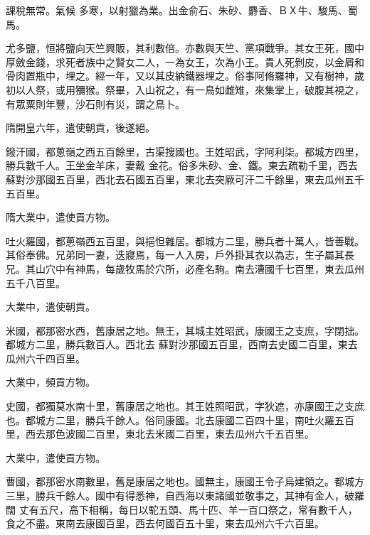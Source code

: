 \begin{pinyinscope}
 課稅無常。氣候
 多寒，以射獵為業。出金俞石、朱砂、麝香、ＢＸ牛、駿馬、蜀馬。



 尤多鹽，恒將鹽向天竺興販，其利數倍。亦數與天竺、黨項戰爭。其女王死，國中厚斂金錢，求死者族中之賢女二人，一為女王，次為小王。貴人死剝皮，以金屑和骨肉置瓶中，埋之。經一年，又以其皮納鐵器埋之。俗事阿脩羅神，又有樹神，歲初以人祭，或用獼猴。祭畢，入山祝之，有一鳥如雌雉，來集掌上，破腹其視之，有眾粟則年豐，沙石則有災，謂之鳥卜。



 隋開皇六年，遣使朝貢，後遂絕。



 鏺汗國，都蔥嶺之西五百餘里，古渠搜國也。王姓昭武，字阿利柒。都城方四里，勝兵數千人。王坐金羊床，妻戴
 金花。俗多朱砂、金、鐵。東去疏勒千里，西去蘇對沙那國五百里，西北去石國五百里，東北去突厥可汗二千餘里，東去瓜州五千五百里。



 隋大業中，遣使貢方物。



 吐火羅國，都蔥嶺西五百里，與挹怛雜居。都城方二里，勝兵者十萬人，皆善戰。其俗奉佛。兄弟同一妻，迭寢焉，每一人入房，戶外掛其衣以為志，生子屬其長兄。其山穴中有神馬，每歲牧馬於穴所，必產名駒。南去漕國千七百里，東去瓜州五千八百里。



 大業中，遣使朝貢。



 米國，都那密水西，舊康居之地。無王，其城主姓昭武，康國王之支庶，字閉拙。都城方二里，勝兵數百人。西北去
 蘇對沙那國五百里，西南去史國二百里，東去瓜州六千四百里。



 大業中，頻貢方物。



 史國，都獨莫水南十里，舊康居之地也。其王姓照昭武，字狄遮，亦康國王之支庶也。都城方二里，勝兵千餘人。俗同康國。北去康國二百四十里，南吐火羅五百里，西去那色波國二百里，東北去米國二百里，東去瓜州六千五百里。



 大業中，遣使貢方物。



 曹國，都那密水南數里，舊是康居之地也。國無主，康國王令子烏建領之。都城方三里，勝兵千餘人。國中有得悉神，自西海以東諸國並敬事之，其神有金人，破羅闊
 丈有五尺，高下相稱，每日以駝五頭、馬十匹、羊一百口祭之，常有數千人，食之不盡。東南去康國百里，西去何國百五十里，東去瓜州六千六百里。




\end{pinyinscope}

